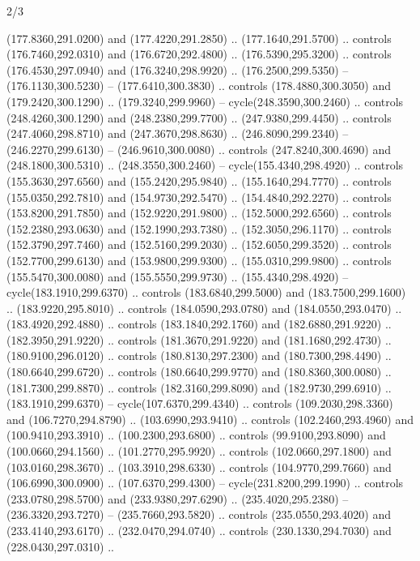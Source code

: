 \begin{flagdescription}{2/3}
\begin{scope}[xshift=0.5\flaglength,yshift=0.5\flagwidth,scale=\stretchfactor]
\begin{scope}[scale=0.001645\flagwidth,yshift=65mm,xshift=-63mm]
\begin{scope}[y=0.80pt, x=0.80pt, yscale=-1,]
\begin{scope}[cm={{1.33333,0.0,0.0,1.33333,(0.0,1e-05)}}]
  (177.8360,291.0200) and (177.4220,291.2850) .. (177.1640,291.5700) .. controls
  (176.7460,292.0310) and (176.6720,292.4800) .. (176.5390,295.3200) .. controls
  (176.4530,297.0940) and (176.3240,298.9920) .. (176.2500,299.5350) --
  (176.1130,300.5230) -- (177.6410,300.3830) .. controls (178.4880,300.3050) and
  (179.2420,300.1290) .. (179.3240,299.9960) -- cycle(248.3590,300.2460) ..
  controls (248.4260,300.1290) and (248.2380,299.7700) .. (247.9380,299.4450) ..
  controls (247.4060,298.8710) and (247.3670,298.8630) .. (246.8090,299.2340) --
  (246.2270,299.6130) -- (246.9610,300.0080) .. controls (247.8240,300.4690) and
  (248.1800,300.5310) .. (248.3550,300.2460) -- cycle(155.4340,298.4920) ..
  controls (155.3630,297.6560) and (155.2420,295.9840) .. (155.1640,294.7770) ..
  controls (155.0350,292.7810) and (154.9730,292.5470) .. (154.4840,292.2270) ..
  controls (153.8200,291.7850) and (152.9220,291.9800) .. (152.5000,292.6560) ..
  controls (152.2380,293.0630) and (152.1990,293.7380) .. (152.3050,296.1170) ..
  controls (152.3790,297.7460) and (152.5160,299.2030) .. (152.6050,299.3520) ..
  controls (152.7700,299.6130) and (153.9800,299.9300) .. (155.0310,299.9800) ..
  controls (155.5470,300.0080) and (155.5550,299.9730) .. (155.4340,298.4920) --
  cycle(183.1910,299.6370) .. controls (183.6840,299.5000) and
  (183.7500,299.1600) .. (183.9220,295.8010) .. controls (184.0590,293.0780) and
  (184.0550,293.0470) .. (183.4920,292.4880) .. controls (183.1840,292.1760) and
  (182.6880,291.9220) .. (182.3950,291.9220) .. controls (181.3670,291.9220) and
  (181.1680,292.4730) .. (180.9100,296.0120) .. controls (180.8130,297.2300) and
  (180.7300,298.4490) .. (180.6640,299.6720) .. controls (180.6640,299.9770) and
  (180.8360,300.0080) .. (181.7300,299.8870) .. controls (182.3160,299.8090) and
  (182.9730,299.6910) .. (183.1910,299.6370) -- cycle(107.6370,299.4340) ..
  controls (109.2030,298.3360) and (106.7270,294.8790) .. (103.6990,293.9410) ..
  controls (102.2460,293.4960) and (100.9410,293.3910) .. (100.2300,293.6800) ..
  controls (99.9100,293.8090) and (100.0660,294.1560) .. (101.2770,295.9920) ..
  controls (102.0660,297.1800) and (103.0160,298.3670) .. (103.3910,298.6330) ..
  controls (104.9770,299.7660) and (106.6990,300.0900) .. (107.6370,299.4300) --
  cycle(231.8200,299.1990) .. controls (233.0780,298.5700) and
  (233.9380,297.6290) .. (235.4020,295.2380) -- (236.3320,293.7270) --
  (235.7660,293.5820) .. controls (235.0550,293.4020) and (233.4140,293.6170) ..
  (232.0470,294.0740) .. controls (230.1330,294.7030) and (228.0430,297.0310) ..

\end{scope}
\end{scope}
\end{scope}
\end{scope}
\end{flagdescription}
